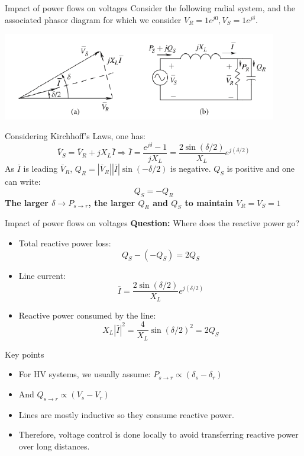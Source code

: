 \begin{frame}{Impact of power flows on voltages}
Consider the following radial system, and the associated phasor diagram for which we consider $V_R = 1 e^{j0}, V_S = 1 e^{j\delta}$.
\begin{center}
\includegraphics[width=0.9\textwidth]{images/RadialSystem2.png}
\end{center}
Considering Kirchhoff's Laws, one has:
$$\bar{V}_S = \bar{V}_R + j X_L \bar{I} \Rightarrow \bar{I} = \frac{e^{j \delta}-1}{j X_L} = \frac{2 \sin(\delta/2)}{X_L} e^{j(\delta/2)}$$
As $\bar{I}$ is leading $\bar{V}_R$, $Q_R = |\bar{V}_R| |\bar{I}| \sin(-\delta/2)$ is negative. $Q_S$ is positive and one can write:
$$Q_S = -Q_R$$
\textbf{The larger $\delta \rightarrow P_{s \rightarrow r}$, the larger $Q_R$ and $Q_S$ to maintain $V_R = V_S = 1$}
\end{frame}

\begin{frame}{Impact of power flows on voltages}
\textbf{Question:} Where does the reactive power go?
\begin{itemize}
    \item Total reactive power loss:
    $$Q_S-(-Q_S) = 2 Q_S$$
    \item Line current:
    $$\bar{I} = \frac{2 \sin(\delta/2)}{X_L} e^{j(\delta/2)}$$
    \item Reactive power consumed by the line:
    $$X_L |\bar{I}|^2 = \frac{4}{X_L} \sin(\delta/2)^2 = 2 Q_S$$
\end{itemize}
\end{frame}

\begin{frame}{Key points}
\begin{itemize}
    \item For HV systems, we usually assume:
    $P_{s \rightarrow r} \propto (\delta_s - \delta_r)$
    \item And $Q_{s \rightarrow r} \propto (V_s-V_r)$
    \item Lines are mostly inductive so they consume reactive power.
    \item Therefore, voltage control is done locally to avoid transferring reactive power over long distances.
\end{itemize}
\end{frame}

